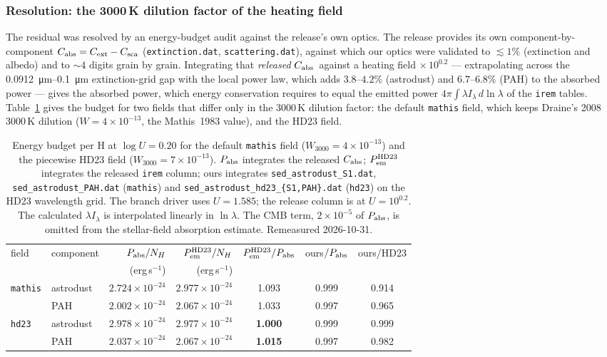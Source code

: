 \documentclass{my_memo}
\newcommand{\Cabs}{\ensuremath{C_{\rm abs}}}
\begin{document}
\subsubsection{Resolution: the 3000\,K dilution factor of the
heating field}
\label{sec:phaseE-resolution}

The residual was resolved by an energy-budget audit against the
release's own optics. The release provides its own
component-by-component $\Cabs = C_{\rm ext} - C_{\rm sca}$
(\texttt{extinction.dat}, \texttt{scattering.dat}), against which our
optics were validated to $\lesssim 1\%$ (extinction and albedo) and to
$\sim 4$ digits grain by grain. Integrating that \emph{released} \Cabs\
against a heating field $\times\,10^{0.2}$ --- extrapolating across the
\SIrange{0.0912}{0.1}{\micro\meter} extinction-grid gap with the local
power law, which adds $3.8$--$4.2\%$ (astrodust) and $6.7$--$6.8\%$
(PAH) to the absorbed power --- gives the absorbed power, which energy
conservation requires to equal the emitted power
$4\pi\int\lambda I_\lambda\,d\ln\lambda$ of the \texttt{irem} tables.
Table~\ref{tab:ad_energy} gives the budget for two fields that differ
only in the 3000\,K dilution factor: the default \texttt{mathis} field,
which keeps Draine's 2008 3000\,K dilution ($W = 4\times10^{-13}$, the
Mathis~1983 value), and the HD23 field.

\begin{table}[h]
\centering
\begin{tabular}{l l r r c c c}
\toprule
field & component & $P_{\rm abs}/N_H$ & $P_{\rm em}^{\rm HD23}/N_H$ &
$P_{\rm em}^{\rm HD23}/P_{\rm abs}$ & ours$/P_{\rm abs}$ & ours/HD23 \\
      &           & (erg\,s$^{-1}$)   & (erg\,s$^{-1}$)            &
& & \\
\midrule
\texttt{mathis} & astrodust & $2.724\times10^{-24}$ & $2.977\times10^{-24}$ &
1.093 & 0.999 & 0.914 \\
                & PAH       & $2.002\times10^{-24}$ & $2.067\times10^{-24}$ &
1.033 & 0.997 & 0.965 \\
\midrule
\texttt{hd23}   & astrodust & $2.978\times10^{-24}$ & $2.977\times10^{-24}$ &
\textbf{1.000} & 0.999 & 0.999 \\
                & PAH       & $2.037\times10^{-24}$ & $2.067\times10^{-24}$ &
\textbf{1.015} & 0.997 & 0.982 \\
\bottomrule
\end{tabular}
\caption{Energy budget per H at $\log U = 0.20$ for the default
\texttt{mathis} field ($W_{3000} = 4\times10^{-13}$) and the piecewise
HD23 field ($W_{3000} = 7\times10^{-13}$). $P_{\rm abs}$ integrates the
released \Cabs; $P_{\rm em}^{\rm HD23}$ integrates the released
\texttt{irem} column; ours integrates \texttt{sed\_astrodust\_S1.dat},
\texttt{sed\_astrodust\_PAH.dat} (\texttt{mathis}) and
\texttt{sed\_astrodust\_hd23\_\{S1,PAH\}.dat} (\texttt{hd23}) on the
HD23 wavelength grid. The branch driver uses $U=1.585$; the
release column is at $U=10^{0.2}$. The calculated
$\lambda I_\lambda$ is interpolated linearly in $\ln\lambda$.
The CMB term, $2\times10^{-5}$ of $P_{\rm abs}$, is omitted from the
stellar-field absorption estimate. Remeasured 2026-10-31.}
\label{tab:ad_energy}
\end{table}
\end{document}
